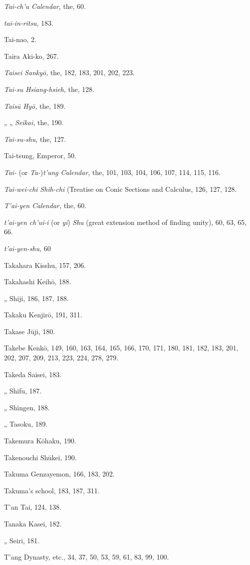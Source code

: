 \documentclass[11pt]{article}
\begin{document}
\emph{Tai-ch'u Calendar,} the, 60.\par
\emph{tai-in-ritsu,} 183.\par
Tai-nao, 2.\par
Taira Aki-ko, 267.\par
\emph{Taisei Sankyō,} the, 182, 183, 201, 202, 223.\par
\emph{Tai-su Hsiang-hsieh,} the, 128.\par
\emph{Taisū Hyō,} the, 189.\par
\quad „ „ \emph{Seikai,} the, 190.\par
\emph{Tai-su-shu,} the, 127.\par
Tai-tsung, Emperor, 50.\par
\emph{Tai-} (or \emph{Ta-})\emph{t'ung Calendar,} the, 101, 103, 104, 106, 107, 114, 115, 116.\par
\emph{Tai-wei-chi Shih-chi} (Treatise on Conic Sections and Calculus, 126, 127, 128.\par
\emph{T'ai-yen Calendar,} the, 60.\par
\emph{t'ai-yen ch'ui-i} (or \emph{yi}) \emph{Shu} (great extension method of finding unity), 60, 63, 65, 66.\par
\emph{t'ai-yen-shu,} 60\par
Takahara Kisshu, 157, 206.\par
Takahashi Keihō, 188.\par
\quad „ Shiji, 186, 187, 188.\par
Takaku Kenjirō, 191, 311.\par
Takase Jūji, 180.\par
Takebe Kenkō, 149, 160, 163, 164, 165, 166, 170, 171, 180, 181, 182, 183, 201, 202, 207, 209, 213, 223, 224, 278, 279.\par
Takeda Saisei, 183.\par
\quad „ Shifu, 187.\par
\quad „ Shingen, 188.\par
\quad „ Tasoku, 189.\par
Takemura Kōhaku, 190.\par
Takenouchi Shūkei, 190.\par
Takuma Genzayemon, 166, 183, 202.\par
Takuma's school, 183, 187, 311.\par
T'an Tai, 124, 138.\par
Tanaka Kasei, 182.\par
\quad „ Seiri, 181.\par
T'ang Dynasty, etc., 34, 37, 50, 53, 59, 61, 83, 99, 100.\par
\end{document}

